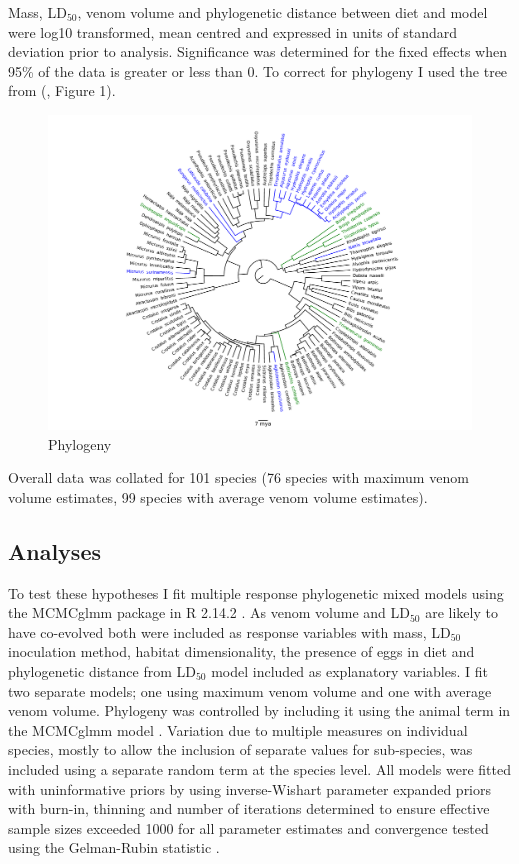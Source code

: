 Mass, LD$_{50}$, venom volume and phylogenetic distance between diet and model were log10 transformed, mean centred and expressed in units of standard deviation prior to analysis. Significance was determined for the fixed effects when 95\% of the data is greater or less than 0. To correct for phylogeny I used the tree from (\cite{pyron2014early}, Figure 1). 


\begin{figure}[h]
  \centering
  \includegraphics[width=.95\textwidth]{ch4-snakes/fig1_snake_phylo.pdf}%
  \caption[Figure 1.]{Phylogeny}
  \label{fig:Figure 1.}
\end{figure}


Overall data was collated for 101 species (76 species with maximum venom volume estimates, 99 species with average venom volume estimates).


\subsection{Analyses}

To test these hypotheses I fit multiple response phylogenetic mixed models using the MCMCglmm package \citep{hadfield2010mcmc} in R 2.14.2 \citep{RCran}. As venom volume and LD$_{50}$ are likely to have co-evolved both were included as response variables with mass, LD$_{50}$ inoculation method, habitat dimensionality, the presence of eggs in diet and phylogenetic distance from LD$_{50}$ model included as explanatory variables. I fit two separate models; one using maximum venom volume and one with average venom volume. Phylogeny was controlled by including it using the animal term in the MCMCglmm model \citep{hadfield2010mcmc}. Variation due to multiple measures on individual species, mostly to allow the inclusion of separate values for sub-species, was included using a separate random term at the species level. All models were fitted with uninformative priors by using inverse-Wishart parameter expanded priors \citep{hadfield2010mcmc} with burn-in, thinning and number of iterations determined to ensure effective sample sizes exceeded 1000 for all parameter estimates and convergence tested using the Gelman-Rubin statistic \citep{gelman1992inference}. 

